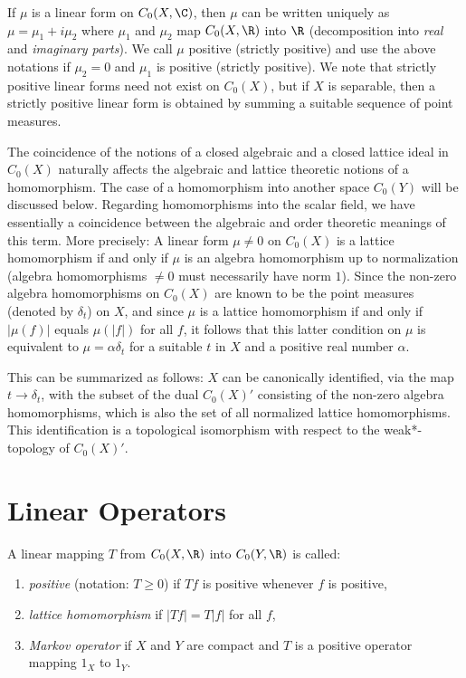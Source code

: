 If $\mu$ is a linear form on $C_{0}(X,\C)$, then $\mu$ can be written uniquely as $\mu = \mu_{1} + i\mu_{2}$ where $\mu_{1}$ and $\mu_{2}$ map $C_{0}(X,\R)$ into $\R$ (decomposition into \emph{real} and \emph{imaginary parts}).
We call $\mu$ positive (strictly positive) and use the above notations if $\mu_{2} = 0$ and $\mu_{1}$ is positive (strictly positive).
We note that strictly positive linear forms need not exist on $C_{0}(X)$, but if $X$ is separable, then a strictly positive linear form is obtained by summing a suitable sequence of point measures.

The coincidence of the notions of a closed algebraic and a closed lattice ideal in $C_{0}(X)$ naturally affects the algebraic and lattice theoretic notions of a homomorphism.
The case of a homomorphism into another space $C_{0}(Y)$ will be discussed below.
Regarding homomorphisms into the scalar field, we have essentially a coincidence between the algebraic and order theoretic meanings of this term. More precisely: A linear form $\mu \neq 0$ on $C_{0}(X)$ is a lattice homomorphism if and only if $\mu$ is an algebra homomorphism up to normalization (algebra homomorphisms $\neq 0$ must necessarily have norm $1$).
Since the non-zero algebra homomorphisms on $C_{0}(X)$ are known to be the point measures (denoted by $\delta_{t}$) on $X$, and since $\mu$ is a lattice homomorphism if and only if $|\mu(f)|$ equals $\mu(|f|)$ for all $f$, it follows that this latter condition on $\mu$ is equivalent to $\mu = \alpha\delta_{t}$ for a suitable $t$ in $X$ and a positive real number $\alpha$.

This can be summarized as follows: $X$ can be canonically identified, via the map $t \to \delta_{t}$, with the subset of the dual $C_{0}(X)'$ consisting of the non-zero algebra homomorphisms, which is also the set of all normalized lattice homomorphisms.
This identification is a topological isomorphism with respect to the weak*-topology of $C_{0}(X)'$.

\section{Linear Operators}\label{sec:b1-1.3}

A linear mapping $T$ from $C_{0}(X,\R)$ into $C_{0}(Y,\R)$ is called:

\begin{enumerate}[label=]
\item
\emph{positive} (notation: $T \geq 0$) if $Tf$ is positive whenever $f$ is positive, 

\item
\emph{lattice homomorphism} if $|Tf| = T|f|$ for all $f$,

\item
\emph{Markov operator} if $X$ and $Y$ are compact and $T$ is a positive operator 
mapping $1_{X}$ to $1_{Y}$.
\end{enumerate}

